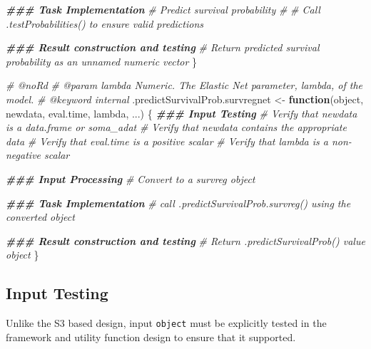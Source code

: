 \documentclass[
]{book}
\newenvironment{Shaded}{\begin{snugshade}}{\end{snugshade}}
\newcommand{\CommentTok}[1]{\textcolor[rgb]{0.56,0.35,0.01}{\textit{#1}}}
\newcommand{\ControlFlowTok}[1]{\textcolor[rgb]{0.13,0.29,0.53}{\textbf{#1}}}
\newcommand{\DocumentationTok}[1]{\textcolor[rgb]{0.56,0.35,0.01}{\textbf{\textit{#1}}}}
\newcommand{\NormalTok}[1]{#1}
\newcommand{\OtherTok}[1]{\textcolor[rgb]{0.56,0.35,0.01}{#1}}
\begin{document}
\begin{Shaded}
\begin{Highlighting}[]
  \DocumentationTok{\#\#\# Task Implementation}
  \CommentTok{\# Predict survival probability}
  \CommentTok{\#}
  \CommentTok{\# Call .testProbabilities() to ensure valid predictions}
  
  \DocumentationTok{\#\#\# Result construction and testing}
  \CommentTok{\# Return predicted survival probability as an unnamed numeric vector}
\NormalTok{\}}

\CommentTok{\#\textquotesingle{} @noRd}
\CommentTok{\#\textquotesingle{} @param lambda Numeric. The Elastic Net parameter, lambda, of the model. }
\CommentTok{\#\textquotesingle{} @keyword internal}
\NormalTok{.predictSurvivalProb.survregnet }\OtherTok{\textless{}{-}} \ControlFlowTok{function}\NormalTok{(object, newdata, }
\NormalTok{                                            eval.time, lambda, ...) \{}
  \DocumentationTok{\#\#\# Input Testing}
  \CommentTok{\# Verify that \textasciigrave{}newdata\textasciigrave{} is a data.frame or soma\_adat}
  \CommentTok{\# Verify that \textasciigrave{}newdata\textasciigrave{} contains the appropriate data}
  \CommentTok{\# Verify that \textasciigrave{}eval.time\textasciigrave{} is a positive scalar}
  \CommentTok{\# Verify that \textasciigrave{}lambda\textasciigrave{} is a non{-}negative scalar}
  
  \DocumentationTok{\#\#\# Input Processing}
  \CommentTok{\# Convert to a survreg object}
  
  \DocumentationTok{\#\#\# Task Implementation}
  \CommentTok{\# call .predictSurvivalProb.survreg() using the converted object}
  
  \DocumentationTok{\#\#\# Result construction and testing}
  \CommentTok{\# Return \textasciigrave{}.predictSurvivalProb()\textasciigrave{} value object}
\NormalTok{\}}
\end{Highlighting}
\end{Shaded}

\hypertarget{input-testing-2}{%
\subsection{Input Testing}\label{input-testing-2}}

Unlike the S3 based design, input \texttt{object} must be explicitly tested in the framework and utility function design to ensure that it supported.
\end{document}
